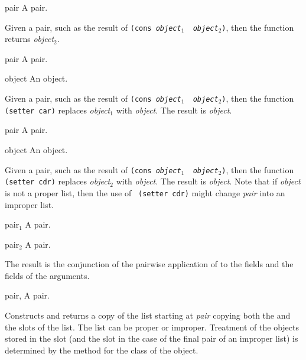 \begin{optDefinition}
%
\begin{arguments}
    \item[pair] A pair.
\end{arguments}
%
\result%
Given a pair, such as the result of {\tt (cons {\em object$_1$} {\em
        object$_2$})}, then the function  returns {\em
    object$_2$}.

%
\begin{arguments}
    \item[pair] A pair.
    \item[object] An object.
\end{arguments}
%
\result%
Given a pair, such as the result of {\tt (cons {\em object$_1$} {\em
        object$_2$})}, then the function {\tt (setter car)} replaces {\em
    object$_1$} with {\em object}.  The result is {\em object}.

%
\begin{arguments}
    \item[pair] A pair.
    \item[object] An object.
\end{arguments}
%
\result%
Given a pair, such as the result of {\tt (cons {\em object$_1$} {\em
        object$_2$})}, then the function {\tt (setter cdr)} replaces {\em
    object$_2$} with {\em object}.  The result is {\em object}.
%
\remarks%
Note that if {\em object\/} is not a proper list, then the use of {\tt
(setter cdr)} might change {\em pair\/} into an improper list.

%
\begin{specargs}
    \item[pair$_1$] A pair.
    \item[pair$_2$] A pair.
\end{specargs}
%
\result%
The result is the conjunction of the pairwise application of 
to the  fields and the  fields of the
arguments.

%
\begin{specargs}
    \item[pair, \classref{cons}] A pair.
\end{specargs}
%
\result%
Constructs and returns a copy of the list starting at {\em pair\/} copying both
the  and the  slots of the list.  The list can
be proper or improper.  Treatment of the objects stored in the 
slot (and the  slot in the case of the final pair of an
improper list) is determined by the  method for the class
of the object.


\end{optDefinition}
